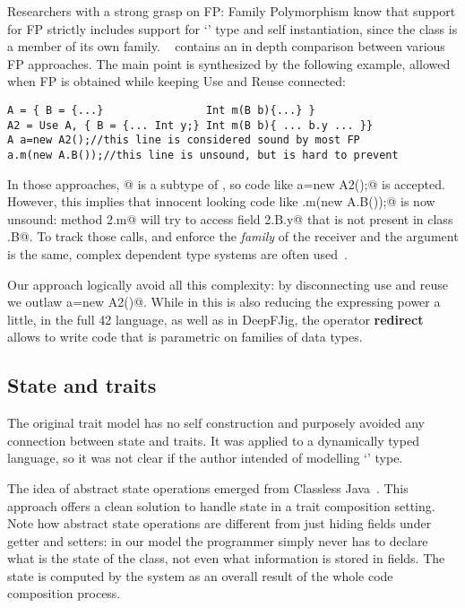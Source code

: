 Researchers with a strong grasp on FP: Family
Polymorphism know that support for FP strictly includes
support for `\Q@This@' type and self instantiation, since the
class is a member of its own family.
~\cite{deep} contains an in depth comparison between various FP approaches.
The main point is synthesized by the following example, allowed when FP 
is obtained while keeping Use and Reuse connected:
\begin{lstlisting}
A = { B = {...}                Int m(B b){...} }
A2 = Use A, { B = {... Int y;} Int m(B b){ ... b.y ... }}
A a=new A2();//this line is considered sound by most FP
a.m(new A.B());//this line is unsound, but is hard to prevent
\end{lstlisting}
In those approaches, @ is a subtype of \Q@A@,
so code like \Q@A a=new A2();@ is accepted.
However, this implies that innocent looking code like
\Q@a.m(new A.B());@ is now unsound: method \Q@A2.m@ will
try to access field \Q@A2.B.y@
that is not present in class \Q@A.B@.
To track those calls, and enforce the \emph{family} of the receiver and the argument is the same, complex dependent type systems are often used~\cite{ernst2004expression,Zenger-Odersky2005}.

Our approach logically avoid all this complexity: by disconnecting use and reuse we outlaw \Q@A a=new A2()@.
While in \name this is also reducing the expressing power a little,
in the full 42 language, as well as in DeepFJig, the operator \textbf{redirect} allows to write code that is parametric on families of data types.

\subsection{State and traits}
The original trait model has no self construction 
and purposely avoided any connection between state and traits.
It was applied to a dynamically typed language, so
it was not clear if the author intended of modelling `\Q@This@' type.


The idea of abstract state operations emerged from Classless
Java~\cite{wang2016classless}. This approach offers a clean solution to handle state
in a trait composition setting.
Note how abstract state operations are different from just hiding fields under getter and setters: 
in our model the programmer simply never has to declare what is the state of the class, not even what information is stored in fields.
The state is computed by the system as an overall result of the whole code composition process.

